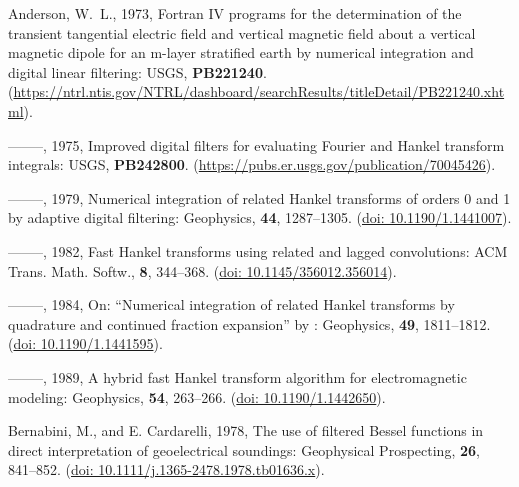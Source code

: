 \documentclass[paper,twocolumn,twoside]{geophysics}
\begin{document}
\begin{thebibliography}{}
\itemsep0pt

Anderson, W.~L.,  1973, Fortran {IV} programs for the determination of the
  transient tangential electric field and vertical magnetic field about a
  vertical magnetic dipole for an m-layer stratified earth by numerical
  integration and digital linear filtering: USGS, {\bf PB221240}.
\newblock
  (\href{https://ntrl.ntis.gov/NTRL/dashboard/searchResults/titleDetail/PB221240.xhtml}{https://ntrl.ntis.gov\-/NTRL\-/dashboard\-/searchResults\-/titleDetail\-/PB221240.xhtml}).

--------, 1975, Improved digital filters for evaluating {F}ourier and {H}ankel
  transform integrals: USGS, {\bf PB242800}.
\newblock
  (\href{https://pubs.er.usgs.gov/publication/70045426}{https://pubs.er.usgs.gov/publication/70045426}).

--------, 1979, Numerical integration of related {H}ankel transforms of orders
  0 and 1 by adaptive digital filtering: Geophysics, {\bf 44}, 1287--1305.
\newblock (\href{https://doi.org/10.1190/1.1441007}{doi: 10.1190/1.1441007}).

--------, 1982, Fast {H}ankel transforms using related and lagged convolutions:
  ACM Trans. Math. Softw., {\bf 8}, 344--368.
\newblock (\href{https://doi.org/10.1145/356012.356014}{doi:
  10.1145/356012.356014}).

--------, 1984, {On: “Numerical integration of related Hankel transforms by
  quadrature and continued fraction expansion” by \cite{GEO.83.Chave}}:
  Geophysics, {\bf 49}, 1811--1812.
\newblock (\href{https://doi.org/10.1190/1.1441595}{doi: 10.1190/1.1441595}).

--------, 1989, A hybrid fast {H}ankel transform algorithm for electromagnetic
  modeling: Geophysics, {\bf 54}, 263--266.
\newblock (\href{https://doi.org/10.1190/1.1442650}{doi: 10.1190/1.1442650}).

Bernabini, M., and E. Cardarelli,  1978, The use of filtered {B}essel functions
  in direct interpretation of geoelectrical soundings: Geophysical Prospecting,
  {\bf 26}, 841--852.
\newblock (\href{https://doi.org/10.1111/j.1365-2478.1978.tb01636.x}{doi:
  10.1111/j.1365-2478.1978.tb01636.x}).


\end{thebibliography}
\end{document}
